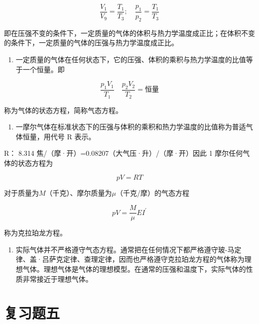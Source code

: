 \[
\frac {V _ {1}}{V _ {9}} = \frac {T _ {1}}{T _ {3}}; \quad \frac {p _ {1}}{p _ {2}} = \frac {T _ {1}}{T _ {3}}
\]

即在压强不变的条件下，一定质量的气体的体积与热力学温度成正比；在体积不变的条件下，一定质量的气体的压强与热力学温度成正比。

\begin{enumerate}
\def\labelenumi{\arabic{enumi}.}
\setcounter{enumi}{5}
\tightlist
\item
  一定质量的气体在任何状态下，它的压强、体积的乘积与热力学温度的比值等于一个恒量。即
\end{enumerate}

\[
\frac {p _ {1} V _ {1}}{T _ {1}} \quad \frac {p _ {2} V _ {2}}{T _ {2}} = \text{恒量}
\]

称为气体的状态方程，简称气态方程。

\begin{enumerate}
\def\labelenumi{\arabic{enumi}.}
\setcounter{enumi}{6}
\tightlist
\item
  一摩尔气体在标准状态下的压强与体积的乘积和热力学温度的比值称为普适气体恒量，用代号
  R 表示。
\end{enumerate}

R： 8.314 焦/（摩·开）=0.08207（大气压·升）/（摩·开）因此 1
摩尔任何气体的状态方程为

\[
p V = R T
\]

对于质量为\(M\)（千克）、摩尔质量为\(\mu\)（千克/摩）的气态方程

\[
p V = \frac {M}{\mu} E I ^ {\prime}
\]

称为克拉珀龙方程。

\begin{enumerate}
\def\labelenumi{\arabic{enumi}.}
\setcounter{enumi}{7}
\tightlist
\item
  实际气体并不严格遵守气态方程。通常把在任何情况下都严格遵守玻-马定律、盖·吕萨克定律、查理定律，因而也严格遵守克拉珀龙方程的气体称为理想气体。理想气体是气体的理想模型。在通常的压强和温度下，实际气体的性质非常接近于理想气体。
\end{enumerate}

\section{复习题五}\label{ux590dux4e60ux9898ux4e94}

